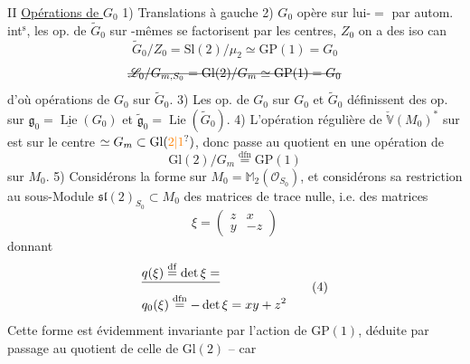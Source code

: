 II \uline{Opérations de $G_0$}
1) Translations à gauche
2) $G_0$ opère sur lui-$=$ par autom. int$^{\mathrm s}$, les op. de $\widetilde G_0$  sur -mêmes se factorisent par les centres, $Z_0$  on a des  iso can
\[
 \widetilde G_0/Z_0=\mathrm{Sl}(2)/\mu_2\simeq\mathrm{GP}(1)=G_0\tag*{(1)}
\]
\[
 \deleted{\mathscr L_0/G_{m,S_0}=\mathrm{Gl}(2)/G_m\simeq\mathrm{GP}(1)=G_0}
\]
d'où opérations de $G_0$ sur $\widetilde G_0$. 
3) Les op. de $G_0$ sur $G_0$ et $\widetilde G_0$ définissent des op. sur $\mathfrak g_0=\underline{\operatorname{Lie}}(G_0)$ et $\widetilde{\mathfrak g}_0=\operatorname{Lie}(\widetilde G_0)$.
4) L'opération régulière de $\check{\mathbb V}(M_0)^*$  sur   est  sur le centre $\simeq G_m\subset\mathrm{Gl}(\unsure{2|1})$, donc passe au quotient en une opération de
\[
 \mathrm{Gl}(2)/G_m\overset{\mathrm{dfn}}{=}\mathrm{GP}(1)\tag*{(2)}
\]
sur $M_0$.
5) Considérons la forme \inserted{$\xi\mapsto-\det(\unsure{\vert|\xi})$} sur $M_0=\mathbb M_2(\mathcal O_{S_0})$, et considérons sa restriction au sous-Module $\mathfrak{sl}(2)_{S_0}\subset M_0$ des matrices de trace nulle,  i.e. des matrices
\[
 \xi=\begin{pmatrix}z&x\\y&-z\end{pmatrix}\tag*{(3)}
\]
donnant
\[
 \begin{aligned}
 &\deleted{q(\xi)\overset{\mathrm{df}}{=}\det\xi=}\\
 &q_0(\xi)\overset{\mathrm{dfn}}{=}-\det\xi=xy+z^2
 \end{aligned}\tag*{(4)}
\]
Cette forme  est évidemment invariante par l'action de $\mathrm{GP}(1)$, déduite par passage au quotient de celle de $\mathrm{Gl}(2)$ -- car
